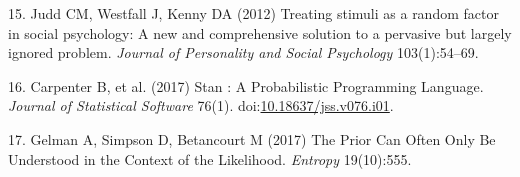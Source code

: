\documentclass[9pt,twocolumn,twoside,]{pnas-new}
\begin{document}
\hypertarget{ref-Judd2012}{}
15. Judd CM, Westfall J, Kenny DA (2012) Treating stimuli as a random
factor in social psychology: A new and comprehensive solution to a
pervasive but largely ignored problem. \emph{Journal of Personality and
Social Psychology} 103(1):54--69.

\hypertarget{ref-Carpenter2017}{}
16. Carpenter B, et al. (2017) Stan : A Probabilistic Programming
Language. \emph{Journal of Statistical Software} 76(1).
doi:\href{https://doi.org/10.18637/jss.v076.i01}{10.18637/jss.v076.i01}.

\hypertarget{ref-Gelman2017}{}
17. Gelman A, Simpson D, Betancourt M (2017) The Prior Can Often Only Be
Understood in the Context of the Likelihood. \emph{Entropy} 19(10):555.



% 
\end{document}
